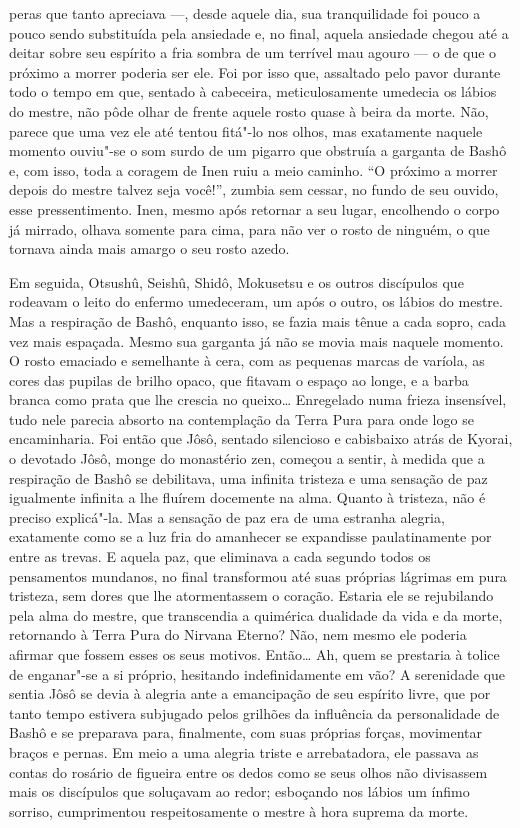 peras que tanto apreciava ---, desde aquele dia, sua tranquilidade foi
pouco a pouco sendo substituída pela ansiedade e, no final, aquela
ansiedade chegou até a deitar sobre seu espírito a fria sombra de um
terrível mau agouro --- o de que o próximo a morrer poderia ser ele. Foi
por isso que, assaltado pelo pavor durante todo o tempo em que, sentado
à cabeceira, meticulosamente umedecia os lábios do mestre, não pôde
olhar de frente aquele rosto quase à beira da morte. Não, parece que
uma vez ele até tentou fitá"-lo nos olhos, mas exatamente naquele
momento ouviu"-se o som surdo de um pigarro que obstruía a garganta de
Bashô e, com isso, toda a coragem de Inen ruiu a meio caminho. ``O
próximo a morrer depois do mestre talvez seja você!'', zumbia sem
cessar, no fundo de seu ouvido, esse pressentimento. Inen, mesmo após
retornar a seu lugar, encolhendo o corpo já mirrado, olhava somente
para cima, para não ver o rosto de ninguém, o que tornava ainda mais
amargo o seu rosto azedo.

Em seguida, Otsushû, Seishû, Shidô, Mokusetsu e os outros discípulos que
rodeavam o leito do enfermo umedeceram, um após o outro, os lábios do
mestre. Mas a respiração de Bashô, enquanto isso, se fazia mais tênue a
cada sopro, cada vez mais espaçada. Mesmo sua garganta já não se movia
mais naquele momento. O rosto emaciado e semelhante à cera, com as
pequenas marcas de varíola, as cores das pupilas de brilho opaco, que
fitavam o espaço ao longe, e a barba branca como prata que lhe crescia
no queixo\ldots{} Enregelado numa frieza insensível, tudo nele parecia
absorto na contemplação da Terra Pura para onde logo se encaminharia.
Foi então que Jôsô, sentado silencioso e cabisbaixo atrás de Kyorai, o
devotado Jôsô, monge do monastério zen, começou a sentir, à medida que
a respiração de Bashô se debilitava, uma infinita tristeza e uma
sensação de paz igualmente infinita a lhe fluírem docemente na alma.
Quanto à tristeza, não é preciso explicá"-la. Mas a sensação de paz era
de uma estranha alegria, exatamente como se a luz fria do amanhecer se
expandisse paulatinamente por entre as trevas. E aquela paz, que
eliminava a cada segundo todos os pensamentos mundanos, no final
transformou até suas próprias lágrimas em pura tristeza, sem dores que
lhe atormentassem o coração. Estaria ele se rejubilando pela alma do
mestre, que transcendia a quimérica dualidade da vida e da morte,
retornando à Terra Pura do Nirvana Eterno? Não, nem mesmo ele poderia
afirmar que fossem esses os seus motivos. Então\ldots{} Ah, quem se
prestaria à tolice de enganar"-se a si próprio, hesitando
indefinidamente em vão? A serenidade que sentia Jôsô se devia à alegria
ante a emancipação de seu espírito livre, que por tanto tempo estivera
subjugado pelos grilhões da influência da personalidade de Bashô e se
preparava para, finalmente, com suas próprias forças, movimentar braços
e pernas. Em meio a uma alegria triste e arrebatadora, ele passava as
contas do rosário de figueira entre os dedos como se seus olhos não
divisassem mais os discípulos que soluçavam ao redor; esboçando nos
lábios um ínfimo sorriso, cumprimentou respeitosamente o mestre à hora
suprema da morte.

